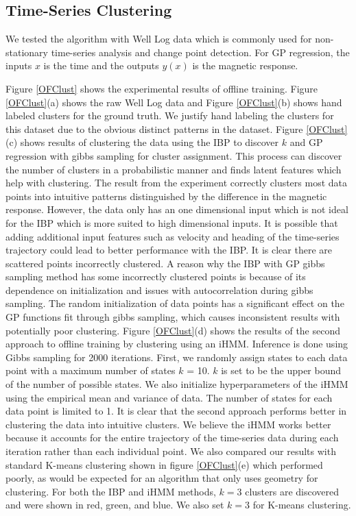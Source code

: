 \documentclass{article}
\begin{document}
\subsection{Time-Series Clustering}

We tested the algorithm with Well Log data \cite{WellLog} which is commonly used for non-stationary time-series analysis and change point detection. For GP regression, the inputs $x$ is the time and the outputs $y(x)$ is the magnetic response.

Figure \ref{OFClust} shows the experimental results of offline training. Figure \ref{OFClust}(a) shows the raw Well Log data and Figure \ref{OFClust}(b) shows hand labeled clusters for the ground truth. We justify hand labeling the clusters for this dataset due to the obvious distinct patterns in the dataset. Figure \ref{OFClust}(c) shows results of clustering the data using the IBP to discover $k$ and GP regression with gibbs sampling for cluster assignment. This process can discover the number of clusters in a probabilistic manner and finds latent features which help with clustering. The result from the experiment correctly clusters most data points into intuitive patterns distinguished by the difference in the magnetic response. However, the data only has an one dimensional input which is not ideal for the IBP which is more suited to high dimensional inputs. It is possible that adding additional input features such as velocity and heading of the time-series trajectory could lead to better performance with the IBP. It is clear there are scattered points incorrectly clustered. A reason why the IBP with GP gibbs sampling method has some incorrectly clustered points is because of its dependence on initialization and issues with autocorrelation during gibbs sampling. The random initialization of data points has a significant effect on the GP functions fit through gibbs sampling, which causes inconsistent results with potentially poor clustering. Figure \ref{OFClust}(d) shows the results of the second approach to offline training by clustering using an iHMM. Inference is done using Gibbs sampling for 2000 iterations. First, we randomly assign states to each data point with a maximum number of states $k$ = 10. $k$ is set to be the upper bound of the number of possible states. We also initialize hyperparameters of the iHMM using the empirical mean and variance of data. The number of states for each data point is limited to 1. It is clear that the second approach performs better in clustering the data into intuitive clusters. We believe the iHMM works better because it accounts for the entire trajectory of the time-series data during each iteration rather than each individual point. We also compared our results with standard K-means clustering shown in figure \ref{OFClust}(e) which performed poorly, as would be expected for an algorithm that only uses geometry for clustering. For both the IBP and iHMM methods, $k=3$ clusters are discovered and were shown in red, green, and blue. We also set $k=3$ for K-means clustering.
\end{document}
